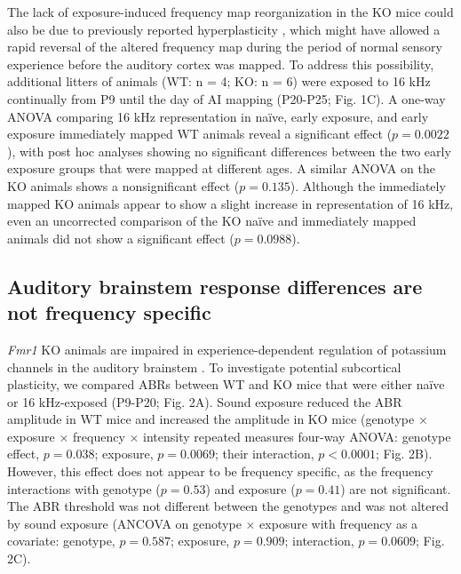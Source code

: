 \begin{figure}[p]
\begin{changemargin}{1in}{1in}
	\end{changemargin}
\end{figure}


The lack of exposure-induced frequency map reorganization in the KO mice could also be due to previously reported hyperplasticity \cite{Dolen2007}, which might have allowed a rapid reversal of the altered frequency map during the period of normal sensory experience before the auditory cortex was mapped. To address this possibility, additional litters of animals (WT: n = 4; KO: n = 6) were exposed to 16 kHz continually from P9 until the day of AI mapping (P20-P25; Fig. 1C). A one-way ANOVA comparing 16 kHz representation in na\"ive, early exposure, and early exposure immediately mapped WT animals reveal a significant effect ($p=0.0022$), with post hoc analyses showing no significant differences between the two early exposure groups that were mapped at different ages. A similar ANOVA on the KO animals shows a nonsignificant effect ($p=0.135$). Although the immediately mapped KO animals appear to show a slight increase in representation of 16 kHz, even an uncorrected comparison of the KO na\"ive and immediately mapped animals did not show a significant effect ($p=0.0988$).

\subsection{Auditory brainstem response differences are not frequency specific}

\textit{Fmr1} KO animals are impaired in experience-dependent regulation of potassium channels in the auditory brainstem \cite{Strumbos2010}. To investigate potential subcortical plasticity, we compared ABRs between WT and KO mice that were either na\"ive or 16 kHz-exposed (P9-P20; Fig. 2A). Sound exposure reduced the ABR amplitude in WT mice and increased the amplitude in KO mice (genotype $\times$ exposure $\times$ frequency $\times$ intensity repeated measures four-way ANOVA: genotype effect, $p=0.038$; exposure, $p=0.0069$; their interaction, $p<0.0001$; Fig. 2B). However, this effect does not appear to be frequency specific, as the frequency interactions with genotype ($p=0.53$) and exposure ($p=0.41$) are not significant. The ABR threshold was not different between the genotypes and was not altered by sound exposure (ANCOVA on genotype $\times$ exposure with frequency as a covariate: genotype, $p=0.587$; exposure, $p=0.909$; interaction, $p=0.0609$; Fig. 2C).

